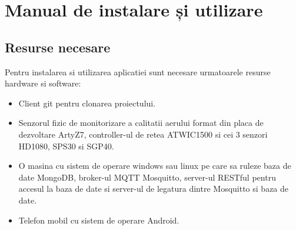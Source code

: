 \chapter{Manual de instalare și utilizare}
\pagestyle{fancy}

\section{Resurse necesare}\label{sec:iu_resurse_necesare}
Pentru instalarea si utilizarea aplicatiei sunt necesare urmatoarele resurse hardware si software:
\begin{itemize}
    \item Client git pentru clonarea proiectului.
	\item Senzorul fizic de monitorizare a calitatii aerului format din placa de dezvoltare ArtyZ7, controller-ul de retea ATWIC1500 si cei 3 senzori HD1080, 
	SPS30 si SGP40.
	\item O masina cu sistem de operare windows sau linux pe care sa ruleze baza de date MongoDB, broker-ul MQTT Mosquitto, server-ul RESTful pentru accesul 
	la baza de date si server-ul de legatura dintre Mosquitto si baza de date.
    \item Telefon mobil cu sistem de operare Android.
\end{itemize}

